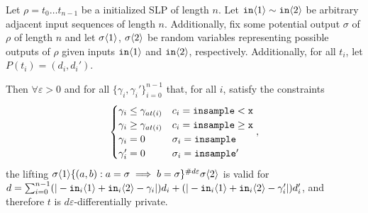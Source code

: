 \begin{lemma}\label{multTransitionsCouplingProof}
    Let $\rho = t_0\ldots t_{n-1}$ be a initialized SLP of length $n$. 
    Let $\texttt{in}\brangle{1}\sim \texttt{in}\brangle{2}$ be arbitrary adjacent input sequences of length $n$. Additionally, fix some potential output $\sigma$ of $\rho$ of length $n$ and let $\sigma\brangle{1}$, $\sigma\brangle{2}$ be random variables representing possible outputs of $\rho$ given inputs $\texttt{in}\brangle{1}$ and $\texttt{in}\brangle{2}$, respectively. Additionally, for all $t_i$, let $P(t_i) = (d_i, d_i')$.

    Then $\forall \varepsilon>0$ and for all $\{\gamma_i, \gamma_i'\}_{i=0}^{n-1}$ that, for all $i$, satisfy the constraints \[
        \begin{cases}
          \gamma_i\leq\gamma_{at(i)} & c_i = \lguard[\texttt{x}]\\
          \gamma_i\geq\gamma_{at(i)} & c_i = \gguard[\texttt{x}]\\
          \gamma_i=0 & \sigma_i = \texttt{insample}\\
          \gamma_i'=0 & \sigma_i = \texttt{insample}'
        \end{cases},
      \]
      the lifting $\sigma\brangle{1}\{(a, b): a=\sigma\implies b=\sigma\}^{\#d\varepsilon}\sigma\brangle{2}$ is valid for $d = \sum_{i=0}^{n-1}(|-\texttt{in}_i\brangle{1}+\texttt{in}_i\brangle{2}-\gamma_i|)d_i+(|-\texttt{in}_i\brangle{1}+\texttt{in}_i\brangle{2}-\gamma_i'|)d_i'$, and therefore $t$ is $d\varepsilon$-differentially private. 
\end{lemma}
